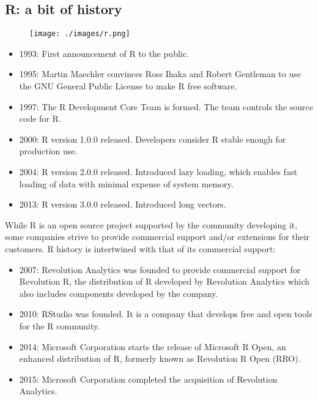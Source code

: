 \documentclass[]{book}
\providecommand{\tightlist}{%
  \setlength{\itemsep}{0pt}\setlength{\parskip}{0pt}}
\def\tightlist{}
\begin{document}
\clearpage

\subsection{R: a bit of history}\label{r-a-bit-of-history}

\begin{figure}[htbp]
\centering
\texttt{[image: ./images/r.png]}
\caption{}
\end{figure}

\begin{itemize}
\tightlist
\item
  1993: First announcement of R to the public.
\item
  1995: Martin Maechler convinces Ross Ihaka and Robert Gentleman to use
  the GNU General Public License to make R free software.
\item
  1997: The R Development Core Team is formed. The team controls the
  source code for R.
\item
  2000: R version 1.0.0 released. Developers consider R stable enough
  for production use.
\item
  2004: R version 2.0.0 released. Introduced lazy loading, which enables
  fast loading of data with minimal expense of system memory.
\item
  2013: R version 3.0.0 released. Introduced long vectors.
\end{itemize}

While R is an open source project supported by the community developing
it, some companies strive to provide commercial support and/or
extensions for their customers. R history is intertwined with that of
its commercial support:

\begin{itemize}
\tightlist
\item
  2007: Revolution Analytics was founded to provide commercial support
  for Revolution R, the distribution of R developed by Revolution
  Analytics which also includes components developed by the company.
\item
  2010: RStudio was founded. It is a company that develops free and open
  tools for the R community.
\item
  2014: Microsoft Corporation starts the release of Microsoft R Open, an
  enhanced distribution of R, formerly known as Revolution R Open (RRO).
\item
  2015: Microsoft Corporation completed the acquisition of Revolution
  Analytics.
\end{itemize}
\end{document}
